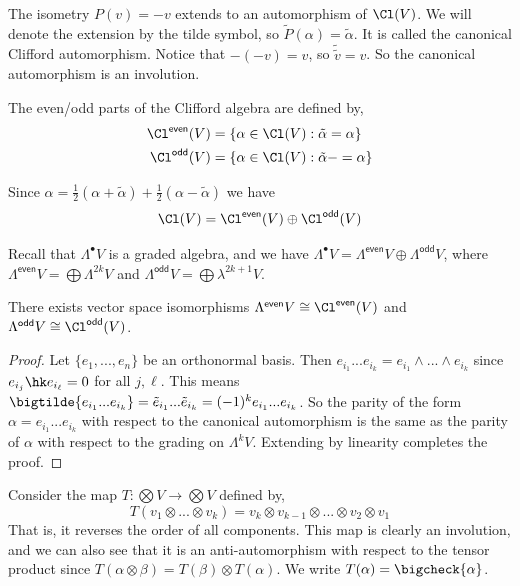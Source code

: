 \begin{defn}
    The isometry $P(v) = -v$ extends to an automorphism of $\Cl(V)$. We will denote the extension by the tilde symbol, so $\tilde{P}(\alpha) = \tilde{\alpha}$. It is called the canonical Clifford automorphism. Notice that $-(-v)=v$, so $\tilde{\tilde{v}}=v$. So the canonical automorphism is an involution.
\end{defn}
\begin{defn}
    The even/odd parts of the Clifford algebra are defined by,
    \begin{align}
        \Cl^{\textsf{even}}(V) &=\{\alpha \in \Cl(V) : \tilde{\alpha}=\alpha\}
        \\
        \Cl^{\textsf{odd}}(V) &=\{\alpha \in \Cl(V) : \tilde{\alpha}-=\alpha\}
    \end{align}
\end{defn}
\begin{lemma}
    Since $\alpha = \frac{1}{2}(\alpha+\tilde{\alpha}) + \frac{1}{2}(\alpha-\tilde{\alpha})$ we have
    \[\Cl(V) = \Cl^{\textsf{even}}(V)\oplus \Cl^{\textsf{odd}}(V)\]
\end{lemma}
Recall that $\Lambda^\bullet V$ is a graded algebra, and we have $\Lambda^\bullet V = \Lambda^{\textsf{even}}V\oplus \Lambda^{\textsf{odd}}V$, where $\Lambda^{\textsf{even}}V = \bigoplus \Lambda^{2k}V$ and $\Lambda^{\textsf{odd}}V = \bigoplus \lambda^{2k+1}V$.
\begin{lemma}
There exists vector space isomorphisms $\Lambda^{\textsf{even}}V \cong \Cl^{\textsf{even}}(V)$ and $\Lambda^{\textsf{odd}}V \cong \Cl^{\textsf{odd}}(V)$.
\end{lemma}
\begin{proof}
    Let $\{e_1,...,e_n\}$ be an orthonormal basis. Then $e_{i_1}...e_{i_k} = e_{i_1}\wedge...\wedge e_{i_k}$ since $e_{i_j}\hk e_{i_\ell}=0$ for all $j,\ell$. This means $\bigtilde{e_{i_1}...e_{i_k}} = \tilde{e}_{i_1}...\tilde{e}_{i_k} = (-1)^k e_{i_1}...e_{i_k}$. So the parity of the form $\alpha = e_{i_1}...e_{i_k}$ with respect to the canonical automorphism is the same as the parity of $\alpha$ with respect to the grading on $\Lambda^k V$. Extending by linearity completes the proof.
\end{proof}
\begin{defn}
Consider the map $T : \bigotimes V \to \bigotimes V$ defined by,
\[T(v_1\otimes...\otimes v_k) = v_k\otimes v_{k-1}\otimes...\otimes v_2\otimes v_1\]
That is, it reverses the order of all components. This map is clearly an involution, and we can also see that it is an anti-automorphism with respect to the tensor product since $T(\alpha\otimes \beta) = T(\beta)\otimes T(\alpha)$. We write $T(\alpha) = \bigcheck{\alpha}$.
\end{defn}

